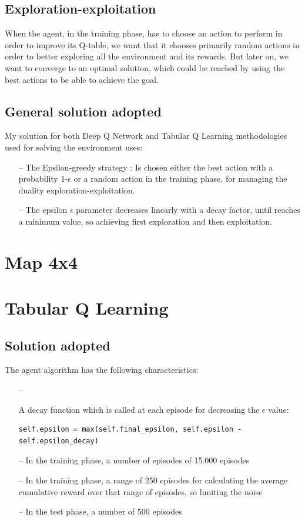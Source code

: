 \documentclass{article}
\begin{document}
\subsection{Exploration-exploitation}

When the agent, in the training phase, has to choose an action to perform in order to improve its Q-table, we want that it chooses primarily random actions in order to better exploring all the environment and its rewards.
But later on, we want to converge to an optimal solution, which could be reached by using the best actions to be able to achieve the goal.


\subsection{General solution adopted}


My solution for both Deep Q Network and Tabular Q Learning methodologies used for solving the environment uses:
\begin{itemize}
\item[--] The Epsilon-greedy strategy : Is chosen either the best action with a probability 1-$\epsilon$ or a random action in the training phase, for managing the duality exploration-exploitation.
\item[--] The epsilon $\epsilon$ parameter decreases linearly with a decay factor, until reaches a minimum value, so achieving first exploration and then exploitation.
\end{itemize}

\section{Map 4x4}



\section{Tabular Q Learning}

\subsection{Solution adopted}

The agent algorithm has the following characteristics:
\begin{itemize}
\item[--] {A decay function which is called at each episode for decreasing the $\epsilon$ value:
\begin{verbatim}
self.epsilon = max(self.final_epsilon, self.epsilon - self.epsilon_decay)
\end{verbatim}
}
\item[--] In the training phase, a number of episodes of 15.000 episodes
\item[--] In the training phase, a range of 250 episodes for calculating the average cumulative reward over that range of episodes, so limiting the noise
\item[--] In the test phase, a number of 500 episodes
\end{itemize}
\end{document}
